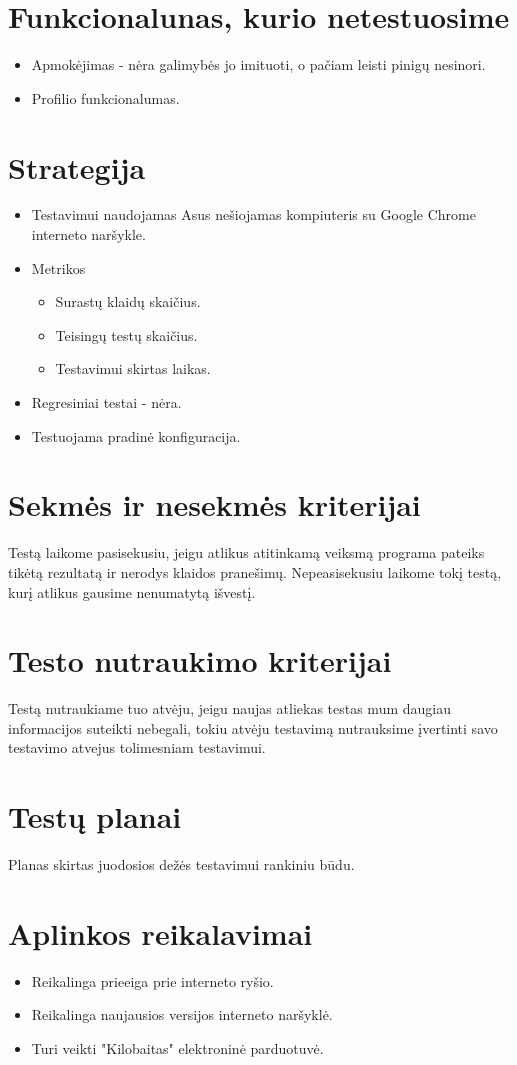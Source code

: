 \documentclass{VUMIFPSkursinis}
\begin{document}
\section{Funkcionalunas, kurio netestuosime}
\begin{itemize}
	\item Apmokėjimas - nėra galimybės jo imituoti, o pačiam leisti pinigų nesinori.
	\item Profilio funkcionalumas.
\end{itemize}
\section{Strategija}
\begin{itemize}
	\item Testavimui naudojamas Asus nešiojamas kompiuteris su Google Chrome interneto naršykle.
	\item Metrikos
	\begin{itemize}
		\item Surastų klaidų skaičius.
		\item Teisingų testų skaičius.
		\item Testavimui skirtas laikas.
	\end{itemize}
	\item Regresiniai testai - nėra.
	\item Testuojama pradinė konfiguracija.
\end{itemize}
\section{Sekmės ir nesekmės kriterijai}
Testą laikome pasisekusiu, jeigu atlikus atitinkamą veiksmą programa pateiks tikėtą rezultatą ir nerodys klaidos pranešimų. Nepeasisekusiu laikome tokį testą, kurį atlikus gausime nenumatytą išvestį.
\section{Testo nutraukimo kriterijai}
Testą nutraukiame tuo atvėju, jeigu naujas atliekas testas mum daugiau informacijos suteikti nebegali, tokiu atvėju testavimą nutrauksime įvertinti savo testavimo atvejus tolimesniam testavimui.
\section{Testų planai}
Planas skirtas juodosios dežės testavimui rankiniu būdu.
\section{Aplinkos reikalavimai}
\begin{itemize}
	\item Reikalinga prieeiga prie interneto ryšio.
	\item Reikalinga naujausios versijos interneto naršyklė.
	\item Turi veikti "Kilobaitas" elektroninė parduotuvė.
\end{itemize}
\end{document}
